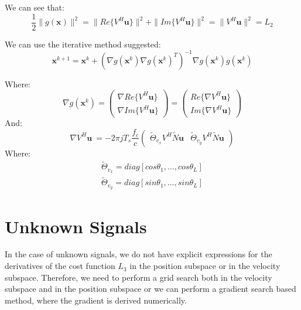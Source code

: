 We can see that:
\begin{equation}
\frac{1}{2}\|g(\mathbf{x})\|^2=\|Re\{V^H \mathbf{u}\}\|^2+\|Im\{V^H \mathbf{u}\}\|^2 = \|V^H\mathbf{u} \|^2 = L_2
\end{equation}

We can use the iterative method suggested:
\begin{equation}
\mathbf{x}^{k+1}=\mathbf{x}^k +\left(\nabla g(\mathbf{x}^k)\nabla g(\mathbf{x}^k)^T\right)^{-1} \nabla g(\mathbf{x}^k) g(\mathbf{x}^k)
\end{equation}

Where:
\begin{equation}
\nabla g(\mathbf{x}^k) = 
\begin{pmatrix} 
\nabla Re\{V^H\mathbf{u}\} \\ \nabla Im\{V^H\mathbf{u}\} 
\end{pmatrix}=
\begin{pmatrix} 
Re \{\nabla V^H\mathbf{u}\} \\ Im\{\nabla V^H\mathbf{u}\} 
\end{pmatrix}
\end{equation}
And:
\begin{equation}
\nabla V^H\mathbf{u}\ = -2 \pi j T_s \frac{f_c}{c}
\begin{pmatrix}  
\tilde{\Theta}_{v_x} V^H \tilde{N} \mathbf{u} &
\tilde{\Theta}_{v_y} V^H \tilde{N} \mathbf{u}
\end{pmatrix}
\end{equation}
Where: 
\begin{eqnarray}
\tilde{\Theta}_{v_x} = diag \left[cos \theta_1, \dots ,cos \theta_L \right] \\
\tilde{\Theta}_{v_y} = diag \left[sin \theta_1, \dots ,sin \theta_L \right]
\end{eqnarray}

\section{Unknown Signals}
In the case of unknown signals, we do not have explicit expressions for the derivatives of the cost function $L_3$ in the position subspace or in the velocity subspace.
Therefore, we need to perform a grid search both in the velocity subspace and in the position subspace or we can perform a gradient search based method, where the gradient is derived numerically.


